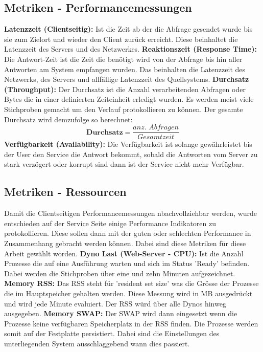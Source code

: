 \documentclass[main.tex]{subfiles}
\begin{document}
\subsection{Metriken - Performancemessungen}

\textbf{Latenzzeit (Clientseitig):} Ist die Zeit ab der die Abfrage gesendet wurde bis sie zum Zielort und wieder den Client zurück erreicht. Diese beinhaltet die Latenzzeit des Servers und des Netzwerkes. 
\newline
\noindent
\textbf{Reaktionszeit (Response Time):} Die Antwort-Zeit ist die Zeit die benötigt wird von der Abfrage bis hin aller Antworten am System empfangen wurden. Das beinhalten die Latenzzeit des Netzwerks, des Servers und allfällige Latenzzeit des Quellsystems.
\newline
\noindent
\textbf{Durchsatz (Throughput):} Der Durchsatz ist die Anzahl verarbeitenden Abfragen oder Bytes die in einer definierten Zeiteinheit erledigt wurden. Es werden meist viele Stichproben gemacht um den Verlauf protokollieren zu können. Der gesamte Durchsatz wird demzufolge so berechnet:
\begin{equation}
\textbf{Durchsatz} = \frac{\textit{anz. Abfragen}}{\textit{Gesamtzeit}}
\end{equation}
\newline
\noindent
\textbf{Verfügbarkeit (Availability):} Die Verfügbarkeit ist solange gewährleistet bis der User den Service die Antwort bekommt, sobald die Antworten vom Server zu stark verzögert oder korrupt sind dann ist der Service nicht mehr Verfügbar. 






\subsection{Metriken - Ressourcen}
Damit die Clientseitigen Performancemessungen nbachvollziehbar werden, wurde entschieden auf der Service Seite einige Performance Indikatoren zu protokollieren. Diese sollen dann mit der guten oder schlechten Performance in Zusammenhang gebracht werden können. Dabei sind diese Metriken für diese Arbeit gewählt worden. 
\newline
\noindent
\textbf{Dyno Last (Web-Server - CPU): } Ist die Anzahl Prozesse die auf eine Ausführung warten und sich im Status 'Ready' befinden. Dabei werden die Stichproben über eine und zehn Minuten aufgezeichnet. 
\newline
\noindent
\textbf{Memory RSS:} Das RSS steht für 'resident set size' was die Grösse der Prozesse die im Hauptspeicher gehalten werden. Diese Messung wird in MB ausgedrückt und wird jede Minute evaluiert. Der RSS würd über alle Dynos hinweg ausgegeben.
\newline
\noindent
\textbf{Memory SWAP:} Der SWAP wird dann eingesetzt wenn die Prozesse keine verfügbaren Speicherplatz in der RSS finden. Die Prozesse werden somit auf der Festplatte persistiert. Dabei sind die Einstellungen des unterliegenden System ausschlaggebend wann dies passiert. 
\end{document}
